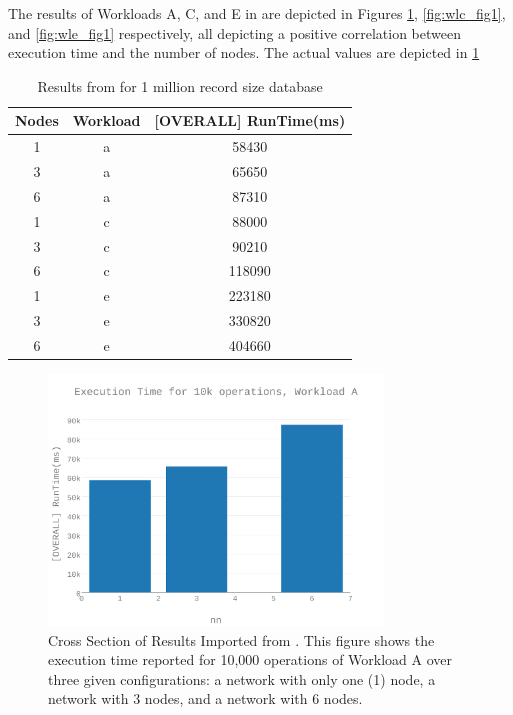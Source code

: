 The results of Workloads A, C, and E in \cite{Abramova2014} are depicted in Figures \ref{fig:wla_fig1}, \ref{fig:wlc_fig1}, and \ref{fig:wle_fig1} respectively, all depicting a positive correlation between execution time and the number of nodes.  The actual values are depicted in \ref{table:previous_paper_results}

\begin{table}
\begin{center}
 \begin{tabular}{||c c c||} 
 \hline
Nodes & Workload & [OVERALL] RunTime(ms) \\ [0.5ex] 
 \hline\hline
1 & a & 58430\\ 
 \hline
3 & a & 65650\\ 
 \hline
6 & a & 87310\\ 
 \hline
1 & c & 88000\\ 
 \hline
3 & c & 90210\\ 
 \hline
6 & c & 118090\\ 
 \hline
1 & e & 223180\\ 
 \hline
3 & e & 330820\\ 
 \hline
6 & e & 404660\\ 
 \hline
\end{tabular}
\end{center}

\caption{Results from \cite{Abramova2014} for 1 million record size database}
\label{table:previous_paper_results}
\end{table}

\begin{figure}[h]
\includegraphics[width=3.5in]{Figures/figures-wla_fig1.pdf}

\caption{Cross Section of Results Imported from \cite{Abramova2014}.  This figure shows the execution time reported for 10,000 operations of Workload A over three given configurations: a network with only one (1) node, a network with 3 nodes, and a network with 6 nodes.}

\label{fig:wla_fig1}
\end{figure}

